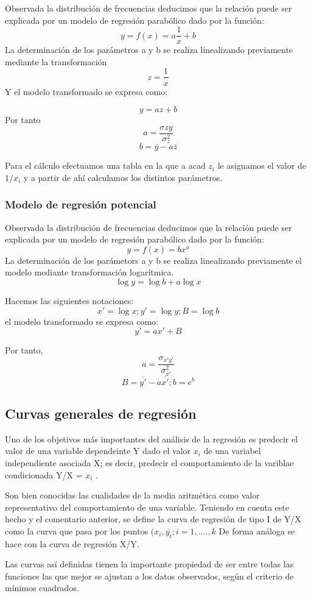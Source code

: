 \documentclass{article}
\begin{document}
Observada la distribución de frecuencias deducimos que la relación puede ser explicada por un modelo de regresión parabólico dado por la función:
$$ y= f(x) = a\frac{1}{x} + b $$
La determinación de los parámetros a y b se realiza linealizando previamente mediante la transformación 
$$ z = \frac{1}{x} $$
Y el modelo transformado se expresa como:

$$ y = az +b $$
Por tanto $$ a = \frac{\sigma{zy} }{\sigma_{z}^2} $$ 
$$ b = \overline{y} - a \overline{z} $$

Para el cálculo efectuamos una tabla en la que a acad $z_i$ le asignamos el valor de $1/x_i$ y a partir de ahí calculamos los distintos parámetros.

\subsubsection{Modelo de regresión potencial}
	Observada la distribución de frecuencias deducimos que la relación puede ser explicada por un modelo de regresión parabólico dado por la función:
$$ y = f(x) = bx^a $$
	La determinación de los parámetors a y b se realiza linealizando previamente el modelo mediante transformación logarítmica.
	$$ \log y = \log b + a\log x $$
	
	Hacemos las siguientes notaciones:
$$x' = \log x; y' = \log y ; B = \log b $$
	el modelo transformado se expresa como:
$$y' = ax' + B $$
	
	Por tanto,
	$$ a = \frac{\sigma_{x'y'} }{\sigma_{x'}^2}$$
	$$ B = \overline{y'} - a\overline{x'} ; b = e^{b} $$

\subsection{Curvas generales de regresión}
Uno de los objetivos más importantes del análisis de la regresión es predecir el valor de una variable dependeinte Y dado el valor $x_i$ de una variabel independiente asociada X;  es decir, predecir el comportamiento de la variblae condicionada Y/X = $x_i$ .

Son bien conocidas las cualidades de la media aritmética como valor representativo del comportamiento de una variable. Teniendo en cuenta este hecho y el comentario anterior, se define la curva de regresión de tipo I de Y/X como la curva que pasa por los puntos $(x_i,\overline{y_i}; i = 1,....,k $ De forma análoga se hace con la curva de regresión X/Y.

Las curvas así definidas tienen la importante propiedad de ser entre todas las funciones las que mejor se ajustan a los datos observados, según el criterio de mínimos cuadrados.
\end{document}
